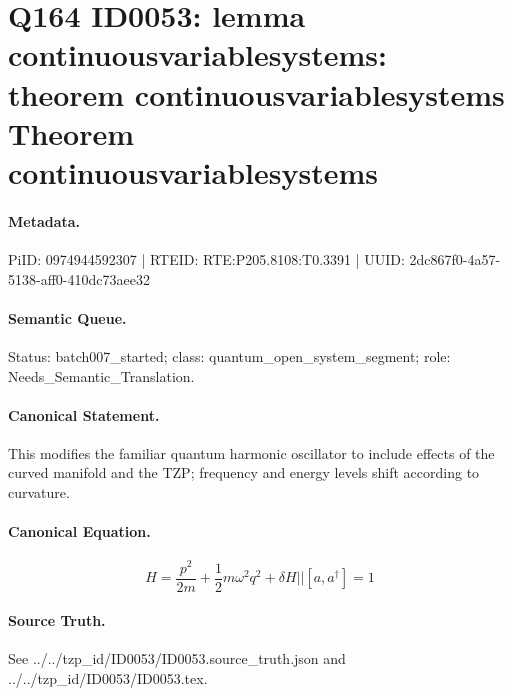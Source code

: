 \section*{Q164 ID0053: lemma continuousvariablesystems: theorem continuousvariablesystems Theorem continuousvariablesystems}
\paragraph{Metadata.}
PiID: 0974944592307 | RTEID: RTE:P205.8108:T0.3391 | UUID: 2dc867f0-4a57-5138-aff0-410dc73aee32

\paragraph{Semantic Queue.}
Status: batch007\_started; class: quantum\_open\_system\_segment; role: Needs\_Semantic\_Translation.

\paragraph{Canonical Statement.}
This modifies the familiar quantum harmonic oscillator to include effects of the curved manifold and the TZP; frequency and energy levels shift according to curvature.

\paragraph{Canonical Equation.}
\[
H = \frac{p^{2}}{2m} + \frac{1}{2}m\omega^{2}q^{2} + \delta H || \left[a,a^{\dagger}\right] = 1
\]

\paragraph{Source Truth.}
See ../../tzp\_id/ID0053/ID0053.source\_truth.json and ../../tzp\_id/ID0053/ID0053.tex.
